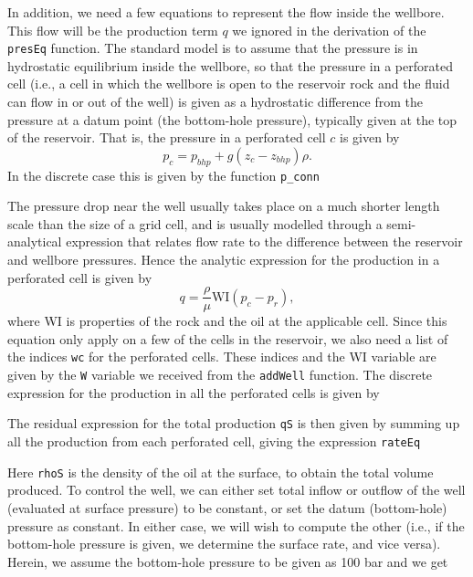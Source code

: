 In addition, we need a few equations to represent the flow inside the wellbore. This flow will be the production term $q$ we ignored in the derivation of the \texttt{presEq} function. The standard model is to assume that the pressure is in hydrostatic equilibrium inside the wellbore, so that the pressure in a perforated cell (i.e., a cell in which the wellbore is open to the reservoir rock and the fluid can flow in or out of the well) is given as a hydrostatic difference from the pressure at a datum point (the bottom-hole pressure), typically given at the top of the reservoir. That is, the pressure in a perforated cell $c$ is given by
\begin{equation*}
p_c = p_{bhp} + g (z_c - z_{bhp})\rho.    
\end{equation*}
In the discrete case this is given by the function \texttt{p\_conn}

The pressure drop near the well usually takes place on a much shorter length scale than the size of a grid cell, and is usually modelled through a semi-analytical expression that relates flow rate to the difference between the reservoir and wellbore pressures. Hence the analytic expression for the production in a perforated cell is given by
\begin{equation*}
    q = \frac{\rho}{\mu}\mbox{WI}(p_c - p_r),
\end{equation*}
where \mbox{WI} is properties of the rock and the oil at the applicable cell. Since this equation only apply on a few of the cells in the reservoir, we also need a list of the indices \texttt{wc} for the perforated cells. These indices and the \mbox{WI} variable are given by the \texttt{W} variable we received from the \texttt{addWell} function. The discrete expression for the production in all the perforated cells is given by

The residual expression for the total production \texttt{qS} is then given by summing up all the production from each perforated cell, giving the expression \texttt{rateEq}

Here \texttt{rhoS} is the density of the oil at the surface, to obtain the total volume produced. To control the well, we can either set total inflow or outflow of the well (evaluated at surface pressure) to be constant, or set the datum (bottom-hole) pressure as constant. In either case, we will wish to compute the other (i.e., if the bottom-hole pressure is given, we determine the surface rate, and vice versa). Herein, we assume the bottom-hole pressure to be given as 100 bar and we get

